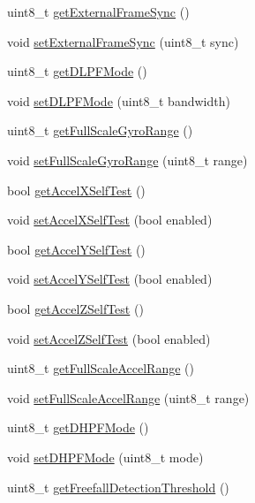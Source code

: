 \begin{DoxyCompactItemize}
\item 
uint8\+\_\+t \hyperlink{class_m_p_u6050_a902a7d486cd6ac21f8c378634dc6f59a}{get\+External\+Frame\+Sync} ()
\item 
void \hyperlink{class_m_p_u6050_a77b36f41c531a11b5a835fc75a9aefe6}{set\+External\+Frame\+Sync} (uint8\+\_\+t sync)
\item 
uint8\+\_\+t \hyperlink{class_m_p_u6050_a9f2737fe22955fd85b2575ba8da874c6}{get\+D\+L\+P\+F\+Mode} ()
\item 
void \hyperlink{class_m_p_u6050_a7a782ade8af2f88dfef7171487f59a3b}{set\+D\+L\+P\+F\+Mode} (uint8\+\_\+t bandwidth)
\item 
uint8\+\_\+t \hyperlink{class_m_p_u6050_acb1fa088d43d76230106a3226f343013}{get\+Full\+Scale\+Gyro\+Range} ()
\item 
void \hyperlink{class_m_p_u6050_a72afc0b6f221c9336f635b5637c62dae}{set\+Full\+Scale\+Gyro\+Range} (uint8\+\_\+t range)
\item 
bool \hyperlink{class_m_p_u6050_a8fc7eab1302281f6e4bc953379f3237b}{get\+Accel\+X\+Self\+Test} ()
\item 
void \hyperlink{class_m_p_u6050_ac2ab843dc9d241056ed0f891195cdbf9}{set\+Accel\+X\+Self\+Test} (bool enabled)
\item 
bool \hyperlink{class_m_p_u6050_a2523e798db3baf9cb9dbf347af16639b}{get\+Accel\+Y\+Self\+Test} ()
\item 
void \hyperlink{class_m_p_u6050_ad5847430ab297959e4d0e9b81ba2e3ba}{set\+Accel\+Y\+Self\+Test} (bool enabled)
\item 
bool \hyperlink{class_m_p_u6050_a57710638eeb6176cf14a8c444bda5300}{get\+Accel\+Z\+Self\+Test} ()
\item 
void \hyperlink{class_m_p_u6050_a8eb8ba039af9a47e0475a3835b87f404}{set\+Accel\+Z\+Self\+Test} (bool enabled)
\item 
uint8\+\_\+t \hyperlink{class_m_p_u6050_a0fe2dad60c170cee7d614e08f243ffd0}{get\+Full\+Scale\+Accel\+Range} ()
\item 
void \hyperlink{class_m_p_u6050_a64eb78e8e359c541beaf8664db3421d1}{set\+Full\+Scale\+Accel\+Range} (uint8\+\_\+t range)
\item 
uint8\+\_\+t \hyperlink{class_m_p_u6050_a4c3b84a906fcb5a65870fa557f797f4a}{get\+D\+H\+P\+F\+Mode} ()
\item 
void \hyperlink{class_m_p_u6050_a44cc43aaad1e52c1ba3142d4490af611}{set\+D\+H\+P\+F\+Mode} (uint8\+\_\+t mode)
\item 
uint8\+\_\+t \hyperlink{class_m_p_u6050_ac7f5c0511fe9d0f3525a3757498daed7}{get\+Freefall\+Detection\+Threshold} ()

\end{DoxyCompactItemize}
